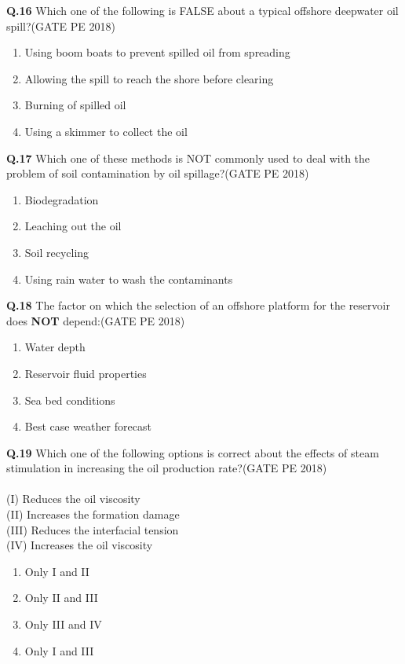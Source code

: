 \documentclass[journal,12pt,onecolumn]{IEEEtran}
\theoremstyle{remark}
\begin{document}
\noindent
\textbf{Q.16} Which one of the following is FALSE about a typical offshore deepwater oil spill?\hfill(GATE PE 2018)
\begin{enumerate}
\item Using boom boats to prevent spilled oil from spreading
\item Allowing the spill to reach the shore before clearing
\item Burning of spilled oil
\item Using a skimmer to collect the oil
\end{enumerate}
\noindent
\textbf{Q.17} Which one of these methods is NOT commonly used to deal with the problem of soil
contamination by oil spillage?\hfill(GATE PE 2018)
\begin{enumerate}
\item Biodegradation
\item Leaching out the oil
\item Soil recycling
\item Using rain water to wash the contaminants
\end{enumerate}
\noindent
\textbf{Q.18} The factor on which the selection of an offshore platform for the reservoir does \textbf{NOT}
depend:\hfill(GATE PE 2018)
\begin{enumerate}
\item Water depth
\item Reservoir fluid properties
\item Sea bed conditions
\item Best case weather forecast
\end{enumerate}

\noindent
\textbf{Q.19} Which one of the following options is correct about the effects of steam stimulation in
increasing the oil production rate?\hfill(GATE PE 2018)\\\\
(I) Reduces the oil viscosity\\
(II) Increases the formation damage\\
(III) Reduces the interfacial tension\\
(IV) Increases the oil viscosity
\begin{enumerate}
\item Only I and II
\item Only II and III
\item Only III and IV
\item Only I and III
\end{enumerate}
\pagebreak
\end{document}
